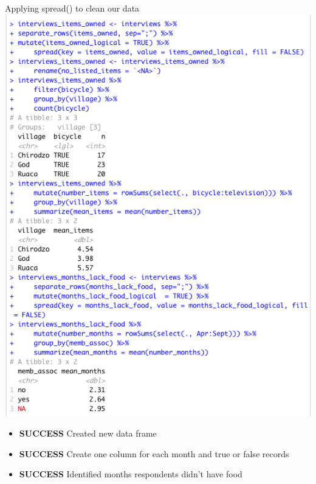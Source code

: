 \documentclass{article}
\begin{document}
Applying spread() to clean our data \\
\includegraphics[width=\textwidth]{Images/RStudio_17.png}
\begin{itemize}
\item \textbf{SUCCESS} Created new data frame
\item \textbf{SUCCESS} Create one column for each month and true or false records
\item \textbf{SUCCESS} Identified months respondents didn't have food
\end{itemize}
\end{document}
